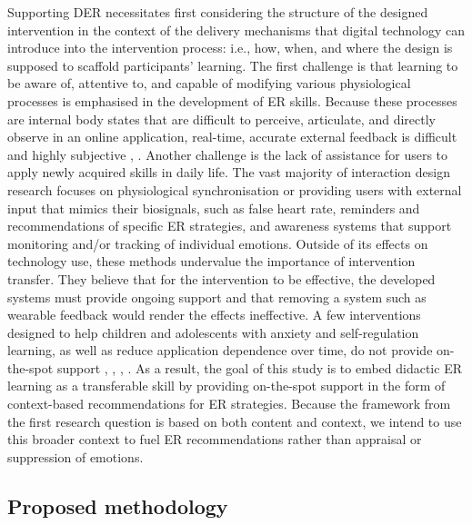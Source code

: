 Supporting DER necessitates first considering the structure of the designed intervention in the context of the delivery mechanisms that digital technology can introduce into the intervention process: i.e., how, when, and where the design is supposed to scaffold participants' learning. The first challenge is that learning to be aware of, attentive to, and capable of modifying various physiological processes is emphasised in the development of ER skills. Because these processes are internal body states that are difficult to perceive, articulate, and directly observe in an online application, real-time, accurate external feedback is difficult and highly subjective \cite{slovak2022designing}, \cite{tag2022emotion}. Another challenge is the lack of assistance for users to apply newly acquired skills in daily life. The vast majority of interaction design research focuses on physiological synchronisation or providing users with external input that mimics their biosignals, such as false heart rate, reminders and recommendations of specific ER strategies, and awareness systems that support monitoring and/or tracking of individual emotions. Outside of its effects on technology use, these methods undervalue the importance of intervention transfer. They believe that for the intervention to be effective, the developed systems must provide ongoing support and that removing a system such as wearable feedback would render the effects ineffective. A few interventions designed to help children and adolescents with anxiety and self-regulation learning, as well as reduce application dependence over time, do not provide on-the-spot support \cite{antle2018opening}, \cite{antle2019design}, \cite{scholten2016randomized}, \cite{slovak2016scaffolding}. As a result, the goal of this study is to embed didactic ER learning as a transferable skill by providing on-the-spot support in the form of context-based recommendations for ER strategies. Because the framework from the first research question is based on both content and context, we intend to use this broader context to fuel ER recommendations rather than appraisal or suppression of emotions.
\subsection{Proposed methodology}~\label{subsec:RQs}